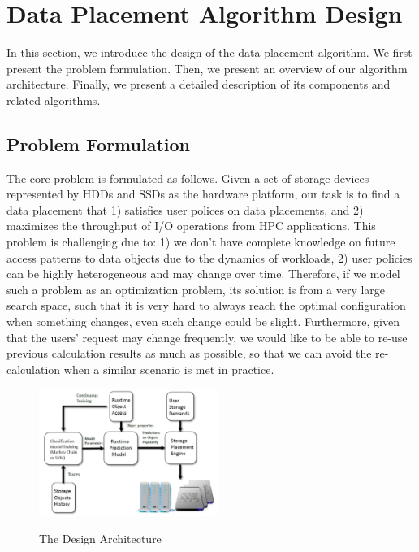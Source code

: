 \section{Data Placement Algorithm Design}
\label{sec:design}

In this section, we introduce the design of the data placement algorithm. We first present the problem formulation. Then, we present an overview of our algorithm architecture. Finally, we present a detailed description of its components and related algorithms.


\subsection{Problem Formulation}
\label{problemformulation}

The core problem is formulated as follows. Given a set of storage devices represented by HDDs and SSDs as the hardware platform, our task is to find a data placement that 1) satisfies user polices on data placements, and 2) maximizes the throughput of I/O operations from HPC applications. This problem is challenging due to: 1) we don't have complete knowledge on future access patterns to data objects due to the dynamics of workloads, 2) user policies can be highly heterogeneous and may change over time. Therefore, if we model such a problem as an optimization problem, its solution is from a very large search space, such that it is very hard to always reach the optimal configuration when something changes, even such change could be slight. Furthermore, given that the users' request may change frequently, we would like to be able to re-use previous calculation results as much as possible, so that we can avoid the re-calculation when a similar scenario is met in practice.



\begin{figure}[t]
\begin{centering}
  \includegraphics[width=2.3in]{./arch.pdf}
  \caption{The Design Architecture}\label{fig:architecture}
  \label{arch}
\end{centering}
\vspace{-0.1in}
\end{figure}






